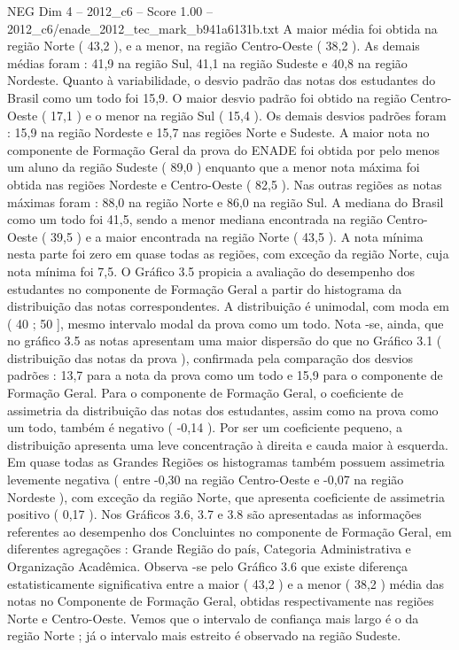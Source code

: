\begin{textsample}{NEG Dim 4 – 2012\_c6 – Score 1.00 – 2012\_c6/enade\_2012\_tec\_mark\_b941a6131b.txt}
A maior média foi obtida na região Norte ( 43,2 ), e a menor, na região Centro-Oeste ( 38,2 ).
As demais médias foram : 41,9 na região Sul, 41,1 na região Sudeste e 40,8 na região Nordeste.
Quanto à variabilidade, o desvio padrão das notas dos estudantes do Brasil como um todo foi 15,9.
O maior desvio padrão foi obtido na região Centro-Oeste ( 17,1 ) e o menor na região Sul ( 15,4 ).
Os demais desvios padrões foram : 15,9 na região Nordeste e 15,7 nas regiões Norte e Sudeste.
A maior nota no componente de Formação Geral da prova do ENADE foi obtida por pelo menos um aluno da região Sudeste ( 89,0 ) enquanto que a menor nota máxima foi obtida nas regiões Nordeste e Centro-Oeste ( 82,5 ).
Nas outras regiões as notas máximas foram : 88,0 na região Norte e 86,0 na região Sul.
A mediana do Brasil como um todo foi 41,5, sendo a menor mediana encontrada na região Centro-Oeste ( 39,5 ) e a maior encontrada na região Norte ( 43,5 ).
A nota mínima nesta parte foi zero em quase todas as regiões, com exceção da região Norte, cuja nota mínima foi 7,5.
O Gráfico 3.5 propicia a avaliação do desempenho dos estudantes no componente de Formação Geral a partir do histograma da distribuição das notas correspondentes.
A distribuição é unimodal, com moda em ( 40 ; 50 ], mesmo intervalo modal da prova como um todo.
Nota -se, ainda, que no gráfico 3.5 as notas apresentam uma maior dispersão do que no Gráfico 3.1 ( distribuição das notas da prova ), confirmada pela comparação dos desvios padrões : 13,7 para a nota da prova como um todo e 15,9 para o componente de Formação Geral.
Para o componente de Formação Geral, o coeficiente de assimetria da distribuição das notas dos estudantes, assim como na prova como um todo, também é negativo ( -0,14 ).
Por ser um coeficiente pequeno, a distribuição apresenta uma leve concentração à direita e cauda maior à esquerda.
Em quase todas as Grandes Regiões os histogramas também possuem assimetria levemente negativa ( entre -0,30 na região Centro-Oeste e -0,07 na região Nordeste ), com exceção da região Norte, que apresenta coeficiente de assimetria positivo ( 0,17 ).
Nos Gráficos 3.6, 3.7 e 3.8 são apresentadas as informações referentes ao desempenho dos Concluintes no componente de Formação Geral, em diferentes agregações : Grande Região do país, Categoria Administrativa e Organização Acadêmica.
Observa -se pelo Gráfico 3.6 que existe diferença estatisticamente significativa entre a maior ( 43,2 ) e a menor ( 38,2 ) média das notas no Componente de Formação Geral, obtidas respectivamente nas regiões Norte e Centro-Oeste.
Vemos que o intervalo de confiança mais largo é o da região Norte ; já o intervalo mais estreito é observado na região Sudeste.

\end{textsample}
